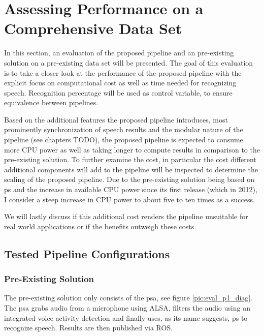 

\section{Assessing Performance on a Comprehensive Data Set}
\label{eval:dataset}

In this section, an evaluation of the proposed pipeline and an pre-existing solution on a pre-existing data set will be presented.
The goal of this evaluation is to take a closer look at the performance of the proposed pipeline with the explicit focus on computational cost as well as time needed for recognizing speech.
Recognition percentage will be used as control variable, to ensure equivalence between pipelines.

Based on the additional features the proposed pipeline introduces, most prominently synchronization of speech results and the modular nature of the pipeline (see chapters TODO), the proposed pipeline is expected to consume more CPU power as well as taking longer to compute results in comparison to the pre-existing solution.
To further examine the cost, in particular the cost different additional components will add to the pipeline will be inspected to determine the scaling of the proposed pipeline.
Due to the pre-existing solution being based on \gls{ps} and the increase in available CPU power since its first release (which in 2012), I consider a steep increase in CPU power to about five to ten times as a success.


We will lastly discuss if this additional cost renders the pipeline unsuitable for real world applications or if the benefits outweigh these costs.


\subsection{Tested Pipeline Configurations} %

\subsubsection{Pre-Existing Solution}

The pre-existing solution only consists of the \gls{psa}, see figure \ref{pic:eval_p1_diag}.
The \gls{psa} grabs audio from a microphone using ALSA, filters the audio using an integrated voice activity detection and finally uses, as its name suggests, \gls{ps} to recognize speech.
Results are then published via ROS.

